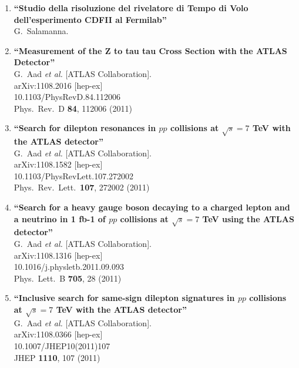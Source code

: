 \documentclass{article}
\begin{document}
\begin{enumerate}
\item%
{\bf ``Studio della risoluzione del rivelatore di Tempo di Volo dell'esperimento CDFII al Fermilab''}
  \\{}G.~Salamanna.
  



\item%
{\bf ``Measurement of the Z to tau tau Cross Section with the ATLAS Detector''}
  \\{}G.~Aad {\it et al.}  [ATLAS Collaboration].
  \\{}arXiv:1108.2016 [hep-ex]
    \\{}10.1103/PhysRevD.84.112006
\\{}Phys.\ Rev.\ D {\bf 84}, 112006 (2011) %


\item%
{\bf ``Search for dilepton resonances in $pp$ collisions at $\sqrt{s}=7$ TeV with the ATLAS detector''}
  \\{}G.~Aad {\it et al.}  [ATLAS Collaboration].
  \\{}arXiv:1108.1582 [hep-ex]
    \\{}10.1103/PhysRevLett.107.272002
\\{}Phys.\ Rev.\ Lett.\  {\bf 107}, 272002 (2011) %


\item%
{\bf ``Search for a heavy gauge boson decaying to a charged lepton and a neutrino in 1 fb-1 of $pp$ collisions at $\sqrt{s}=7$ TeV using the ATLAS detector''}
  \\{}G.~Aad {\it et al.}  [ATLAS Collaboration].
  \\{}arXiv:1108.1316 [hep-ex]
    \\{}10.1016/j.physletb.2011.09.093
\\{}Phys.\ Lett.\ B {\bf 705}, 28 (2011) %


\item%
{\bf ``Inclusive search for same-sign dilepton signatures in $pp$ collisions at $\sqrt{s}=7$ TeV with the ATLAS detector''}
  \\{}G.~Aad {\it et al.}  [ATLAS Collaboration].
  \\{}arXiv:1108.0366 [hep-ex]
    \\{}10.1007/JHEP10(2011)107
\\{}JHEP {\bf 1110}, 107 (2011) %



\end{enumerate}
\end{document}
